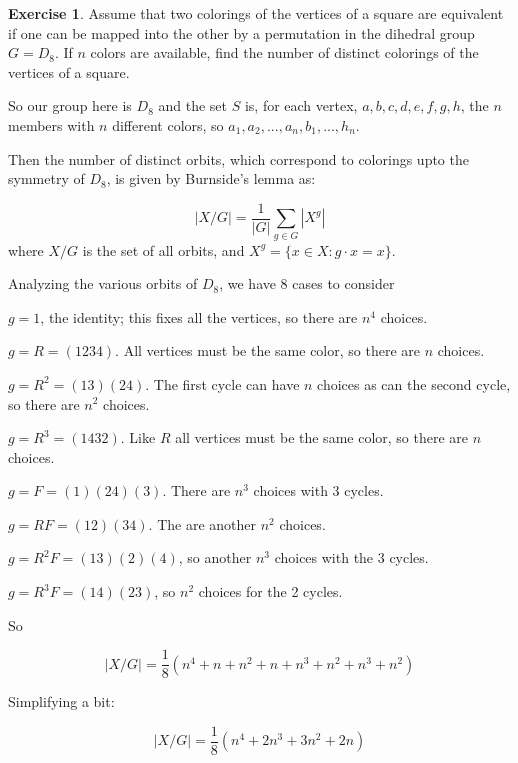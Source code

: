 \documentclass[11pt,oneside]{article}
\numberwithin{equation}{section}
\theoremstyle{definition}
\newtheorem{exercise}{Exercise}
\begin{document}
\begin{exercise}
  Assume that two colorings of the vertices of a square are equivalent
  if one can be mapped into the other by a permutation in the dihedral
  group $G=D_8$.  If $n$ colors are available,
  find the number of distinct colorings of the vertices of a square.
\end{exercise}
\begin{solution}
  So our group here is $D_8$ and the set $S$ is, for each vertex, $a, b, c, d, e, f, g, h$, 
  the $n$ members with $n$ different colors, so $a_1, a_2, ... , a_n, b_1, ... , h_n$.

  Then the number of distinct orbits, which correspond
  to colorings upto the symmetry of $D_8$, is given by Burnside's lemma as:

  \[
  |X / G| = \frac{1}{|G|} \sum \limits _{g \in G} | X^g|
  \]
  where $X/G$ is the set of all orbits, and
  $ X ^g = \{ x \in X : g \cdot x = x \}$.

  Analyzing the various orbits of $D_8$, we have 8 cases to consider

  $ g = 1$, the identity; this fixes all the vertices, so there are $n^4$ choices.  

  $ g = R = (1 2 3 4)$.  All vertices must be the same color, so there
  are $n$ choices.

  $ g = R^2 = (1 3) (2 4)$.  The first cycle can have $n$ choices as can the
  second cycle, so there are $n^2 $ choices.

  $ g = R^3 = (1 4 3 2)$.  Like $R$ all vertices must be the same color, so there
  are $n$ choices.

  $ g = F = (1) (2 4) (3) $.  There are $n^3$ choices with 3 cycles.

  $ g = RF = (1 2) ( 3 4)$.  The are another $n^2$ choices.

  $ g = R^2F = (1 3) (2 ) (4)$, so another $n^3$ choices with the 3 cycles.

  $ g = R^3 F = (1 4) (2 3)$, so $n^2$ choices for the 2 cycles.

  So

  \[
  |X / G| = \frac{1}{8} \left( n^4 + n + n^2 + n + n^3 + n^2 + n^ 3 + n^2 \right)
  \]

  Simplifying a bit:  
  
  \[
  |X / G| = \frac{1}{8} \left( n^4 + 2n^3  + 3n^2 + 2n  \right)
  \]

\end{solution}
\end{document}
